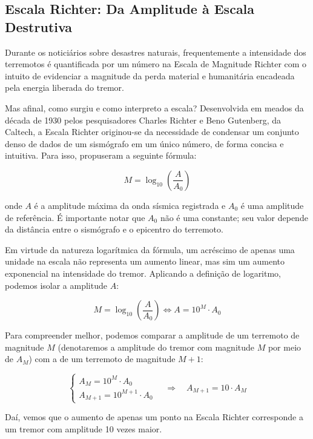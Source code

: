 \subsection{Escala Richter: Da Amplitude à Escala Destrutiva}
Durante os noticiários sobre desastres naturais, frequentemente a intensidade dos terremotos é quantificada por um número na Escala de Magnitude Richter com o intuito de evidenciar a magnitude da perda material e humanitária encadeada pela energia liberada do tremor.

Mas afinal, como surgiu e como interpreto a escala? Desenvolvida em meados da década de 1930 pelos pesquisadores Charles Richter e Beno Gutenberg, da Caltech, a Escala Richter originou-se da necessidade de condensar um conjunto denso de dados de um sismógrafo em um único número, de forma concisa e intuitiva. Para isso, propuseram a seguinte fórmula:

\begin{equation}
    M = \log_{10}\left(\frac{A}{A_0}\right)
\end{equation}

onde $A$ é a amplitude máxima da onda sísmica registrada e $A_0$ é uma amplitude de referência. É importante notar que $A_0$ não é uma constante; seu valor depende da distância entre o sismógrafo e o epicentro do terremoto.

Em virtude da natureza logarítmica da fórmula, um acréscimo de apenas uma unidade na escala não representa um aumento linear, mas sim um aumento exponencial na intensidade do tremor. Aplicando a definição de logaritmo, podemos isolar a amplitude $A$:

\begin{equation}
    M = \log_{10}\left(\frac{A}{A_0}\right) \iff A = 10^{M} \cdot A_0
\end{equation}

Para compreender melhor, podemos comparar a amplitude de um terremoto de magnitude $M$ (denotaremos a amplitude do tremor com magnitude $M$ por meio de $A_M$) com a de um terremoto de magnitude $M+1$:

\begin{equation*}
\begin{cases}
    A_M = 10^{M} \cdot A_0 \\
    A_{M+1} = 10^{M+1} \cdot A_0
\end{cases}
\quad\Longrightarrow\quad A_{M+1} = 10 \cdot A_M
\end{equation*}

Daí, vemos que o aumento de apenas um ponto na Escala Richter corresponde a um tremor com amplitude 10 vezes maior.

